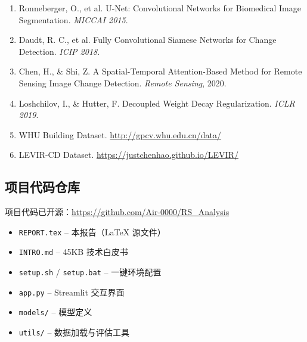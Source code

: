 \documentclass[12pt,a4paper]{article}
\begin{document}
\begin{enumerate}
    \item Ronneberger, O., et al. U-Net: Convolutional Networks for Biomedical Image Segmentation. \textit{MICCAI 2015}.
    \item Daudt, R. C., et al. Fully Convolutional Siamese Networks for Change Detection. \textit{ICIP 2018}.
    \item Chen, H., \& Shi, Z. A Spatial-Temporal Attention-Based Method for Remote Sensing Image Change Detection. \textit{Remote Sensing}, 2020.
    \item Loshchilov, I., \& Hutter, F. Decoupled Weight Decay Regularization. \textit{ICLR 2019}.
    \item WHU Building Dataset. \url{http://gpcv.whu.edu.cn/data/}
    \item LEVIR-CD Dataset. \url{https://justchenhao.github.io/LEVIR/}
\end{enumerate}

\subsection*{项目代码仓库}

项目代码已开源：\url{https://github.com/Air-0000/RS_Analysis}

\begin{itemize}
    \item \texttt{REPORT.tex} -- 本报告（LaTeX 源文件）
    \item \texttt{INTRO.md} -- 45KB 技术白皮书
    \item \texttt{setup.sh} / \texttt{setup.bat} -- 一键环境配置
    \item \texttt{app.py} -- Streamlit 交互界面
    \item \texttt{models/} -- 模型定义
    \item \texttt{utils/} -- 数据加载与评估工具
\end{itemize}
\end{document}
